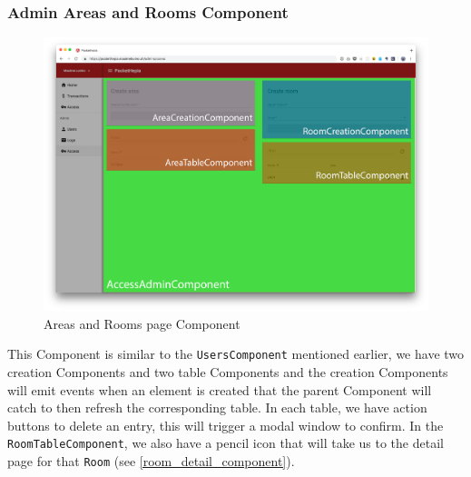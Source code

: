 \documentclass[twoside, openright,11pt,a4paper]{book}
\begin{document}
\subsubsection{Admin Areas and Rooms Component}
\begin{figure}[H]
\begin{center}
	\includegraphics[width=\textwidth]{assets/screens/angular/areas}
	\caption{Areas and Rooms page Component}
			\label{areas_screen}
\end{center}
\end{figure}
This Component is similar to the \verb+UsersComponent+ mentioned earlier, we have two creation Components and two table Components and the creation Components will emit events when an element is created that the parent Component will catch to then refresh the corresponding table. In each table, we have action buttons to delete an entry, this will trigger a modal window to confirm. In the \verb+RoomTableComponent+, we also have a pencil icon that will take us to the detail page for that \verb+Room+ (see \ref{room_detail_component}).
\end{document}
